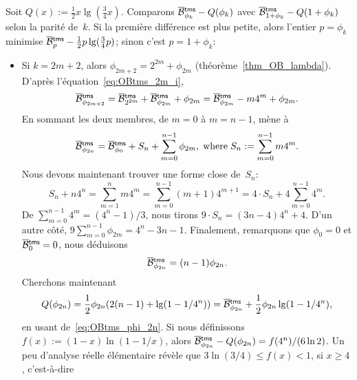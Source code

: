 \noindent Soit \(Q(x) := \tfrac{1}{2}x\lg(\tfrac{3}{4}x)\).  Comparons
\(\OB{\fun{tms}}{\phi_k} - Q(\phi_k)\) avec \(\OB{\fun{tms}}{1+\phi_k}
- Q(1+\phi_k)\) selon la parité de~\(k\). Si la première différence
est plus petite, alors l'entier \(p=\phi_k\) minimise
\(\OB{\fun{tms}}{p} - \tfrac{1}{2}p\lg(\tfrac{3}{4}p)\); sinon c'est
\(p=1+\phi_k\):
\begin{itemize}

  \item Si \(k=2m+2\), alors \(\phi_{2m+2} = 2^{2m} + \phi_{2m}\)
    (théorème~\ref{thm_OB_lambda}). D'après
    l'équation~\eqref{eq:OBtms_2m_i},
    \begin{equation*}
      \OB{\fun{tms}}{\phi_{2m+2}} = \OB{\fun{tms}}{2^{2m}} +
    \OB{\fun{tms}}{\phi_{2m}} + \phi_{2m} = \OB{\fun{tms}}{\phi_{2m}}
    - m4^m + \phi_{2m}.
    \end{equation*}
    En sommant les deux membres, de \(m=0\) à \(m=n-1\), mène à
    \begin{equation*}
      \OB{\fun{tms}}{\phi_{2n}} = \OB{\fun{tms}}{\phi_0} + S_n
    + \sum_{m=0}^{n-1}{\phi_{2m}},\; \text{where}\; S_n :=
    \sum_{m=0}^{n-1}{m4^m}.
    \end{equation*}
    Nous devons maintenant trouver une forme close de~\(S_n\):
    \begin{equation*}
      S_n + n4^n = \sum_{m=1}^{n}{m4^m}
                 = \sum_{m=0}^{n-1}(m+1)4^{m+1}
                 = 4 \cdot S_n + 4\sum_{m=0}^{n-1}4^m.
    \end{equation*}
    De \(\sum_{m=0}^{n-1}4^m = (4^n-1)/3\), nous tirons \(9 \cdot S_n
    = (3n -4)4^n + 4\). D'un autre côté, \(9
    \sum_{m=0}^{n-1}{\phi_{2m}} = 4^n - 3n - 1\). Finalement,
    remarquons que \(\phi_0 = 0\) et \(\OB{\fun{tms}}{0} = 0\), nous
    déduisons
    \begin{equation}
      \OB{\fun{tms}}{\phi_{2n}} = (n-1)\phi_{2n}.
      \label{eq:OBtms_phi_2n}
    \end{equation}
    Cherchons maintenant
    \begin{equation*}
      Q(\phi_{2n}) = \frac{1}{2}\phi_{2n}(2(n-1)
      + \lg(1-1/4^n)) = \OB{\fun{tms}}{\phi_{2n}}
      + \frac{1}{2}\phi_{2n}\lg(1-1/4^n),
    \end{equation*}
    en usant de~\eqref{eq:OBtms_phi_2n}. Si nous définissons \(f(x) :=
    (1-x) \ln(1-1/x)\), alors \(\OB{\fun{tms}}{\phi_{2n}} -
    Q(\phi_{2n}) = f(4^n)/(6\ln 2)\). Un peu d'analyse réelle
    élémentaire révèle que \(3\ln(3/4) \leqslant f(x) < 1\),
    si \(x \geqslant 4\), c'est-à-dire

\end{itemize}
